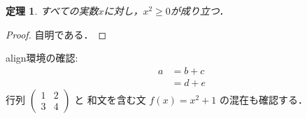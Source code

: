 \documentclass[pdflatex]{jlreq}
\newtheorem{theorem}{定理}
\begin{document}
\begin{theorem}
すべての実数$x$に対し，$x^2 \ge 0$が成り立つ．
\end{theorem}
\begin{proof}
自明である．
\end{proof}
align環境の確認:
\begin{align}
a &= b + c \\
  &= d + e
\end{align}
行列 $\begin{pmatrix} 1 & 2 \\ 3 & 4 \end{pmatrix}$ と
和文を含む文 $f(x) = x^2 + 1$ の混在も確認する．
\end{document}
